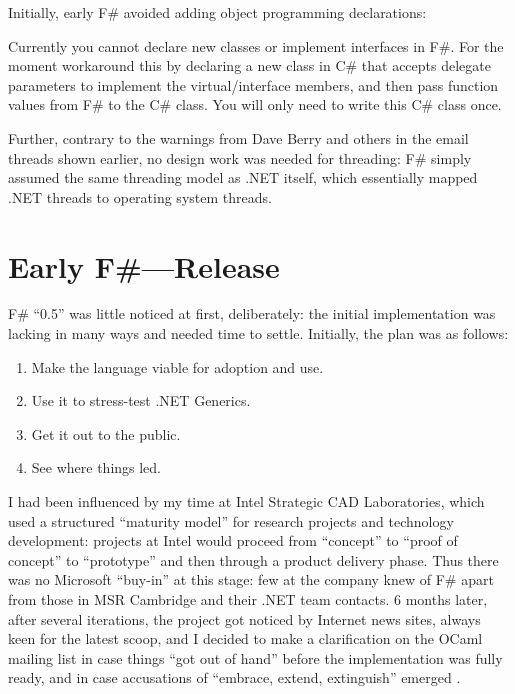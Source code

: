 \documentclass[acmsmall]{acmart}\settopmatter{}
\begin{document}
Initially, early F\# avoided adding object programming declarations:
\begin{verbquote}
Currently you cannot declare new classes or implement interfaces in F#.  For the moment workaround this by declaring a new class in C# that accepts delegate parameters to implement the virtual/interface members, and then pass function values from F# to the C# class.  You will only need to write this C# class once.
\end{verbquote}

Further, contrary to the warnings from Dave Berry and others in the email threads shown earlier, no design work was needed for threading: F\# simply assumed the same threading model as .NET itself, which essentially mapped .NET threads to operating system threads.



\section*{Early F\#---Release}


F\# “0.5” was little noticed at first, deliberately: the initial implementation was lacking in many ways and needed time to settle. Initially, the plan was as follows: 
\begin{enumerate}
\item Make the language viable for adoption and use.
\item Use it to stress-test .NET Generics.
\item Get it out to the public.
\item See where things led.
\end{enumerate}

I had been influenced by my time at Intel Strategic CAD Laboratories, which used a structured “maturity model” for research projects and
technology development: projects at Intel would proceed from “concept” to “proof of concept” to “prototype” and then through a product
delivery phase. Thus there was no Microsoft “buy-in” at this stage: few at the company knew of F\# apart from those in MSR Cambridge
and their .NET team contacts. 6 months later, after several iterations, the project got noticed by Internet news sites, always keen for the
latest scoop, and I decided to make a clarification on the OCaml mailing list in case things “got out of hand” before the implementation was fully
ready, and in case accusations of “embrace, extend, extinguish” emerged \citep{Boulton2003}.
\end{document}
